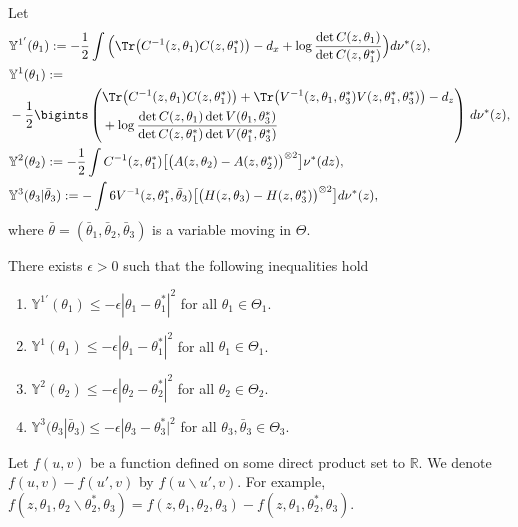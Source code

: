 \documentclass[a4paper,11pt]{jsarticle}
\begin{document}
Let
\begin{align} &\mathbb{Y}^{1'}(\theta_1) :=  - \frac{1}{2} \int \Big(\Tr\big(C^{-1}(z,\theta_1)C(z,\theta^*_1) \big) -d_x + \log \frac{\det C(z,\theta_1) }{\det C(z,\theta_1^*)} \Big)d \nu^*(z),\\
    &\mathbb{Y}^1(\theta_1)  :=\\&  -\frac{1}{2}\bigints \left(\begin{aligned}
       & \Tr\big(C^{-1}(z,\theta_1)C(z,\theta^*_1) \big)+ \Tr\big(V^{-1}(z,\theta_1,\theta_3^*)V(z,\theta_1^*,\theta_3^*)\big) -d_z \\  &+ \log \frac{\det C(z,\theta_1) \det V(\theta_1,\theta_3^*) }{\det C(z,\theta_1^*) \det V(\theta^*_1,\theta_3^*)}
    \end{aligned} \right) \,d\nu^*(z), \\&\mathbb{Y}^2(\theta_2) := -\frac{1}{2}\int C^{-1}(z,\theta_1^*)\big[\big(A(z,\theta_2) - A(z,\theta_2^*)\big)^{\otimes 2} \big] \nu^*(dz),
    \\ & \mathbb{Y}^3(\theta_3| \bar{\theta}_3)   := - \int 6V^{-1}(z, \theta_1^*,\bar{\theta}_3) \big[\big(H(z,\theta_3) - H(z,\theta_3^*)\big)^{\otimes 2} \big] d \nu^*(z),
\end{align}
where $\bar{\theta} = (\bar{\theta}_1,\bar{\theta}_2,\bar{\theta}_3)$ is a variable moving in $\Theta$.
\begin{enumerate}[label = {[{A\arabic*}]},ref=  {[{A\arabic*}]}]\setcounter{enumi}{5}
    \item There exists $\epsilon>0$ such that the following inequalities hold
    \begin{enumerate}[label = (\textbf{\roman*})]
        \item $\mathbb{Y}^{1'} (\theta_1) \leq  -\epsilon|\theta_1 - \theta_1^*|^2 $ for all $\theta_1 \in \Theta_1$.
        \item $\mathbb{Y}^1(\theta_1) \leq  -\epsilon|\theta_1 - \theta_1^*|^2 $ for all $\theta_1 \in \Theta_1$.
        \item $\mathbb{Y}^2(\theta_2 ) \leq -\epsilon|\theta_2 - \theta_2^*|^2 $ for all $\theta_2 \in \Theta_2$.
        \item  $\mathbb{Y}^3(\theta_3 | \bar{\theta}_3) \leq - \epsilon|\theta_3 - \theta_3^*|^2 $ for all $\theta_3,\bar{\theta}_3 \in \Theta_3$.
    \end{enumerate}
\end{enumerate}


Let $f(u,v)$ be a function defined on some direct product set to $\mathbb{R}$. We denote $f(u,v) - f(u',v)$ by $f(u\backslash u',v)$. For example, $f(z,\theta_1,\theta_2 \backslash \theta_2^*,\theta_3) = f(z,\theta_1,\theta_2,\theta_3) - f(z,\theta_1,\theta_2^*,\theta_3)$. 
\end{document}
